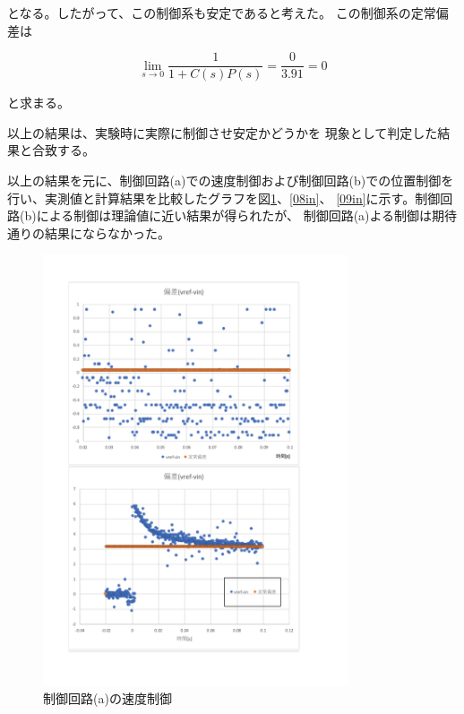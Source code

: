 \documentclass[uplatex, 11pt,a4j, titlepage]{jsarticle}
\begin{document}
となる。したがって、この制御系も安定であると考えた。
この制御系の定常偏差は

\begin{equation}
    \lim_{s \to 0} \frac{1}{1 + C(s)P(s)} 
        = \frac{0}{3.91} = 0
\end{equation}

と求まる。

以上の結果は、実験時に実際に制御させ安定かどうかを
現象として判定した結果と合致する。

以上の結果を元に、制御回路(a)での速度制御および制御回路(b)での位置制御を
行い、実測値と計算結果を比較したグラフを図\ref{07in}、\ref{08in}、
\ref{09in}に示す。制御回路(b)による制御は理論値に近い結果が得られたが、
制御回路(a)よる制御は期待通りの結果にならなかった。

\begin{figure}[h]
    \centering
    \includegraphics[width=9cm]{07in.pdf}
    \caption{制御回路(a)の速度制御}
    \label{07in}
\end{figure}
\end{document}
